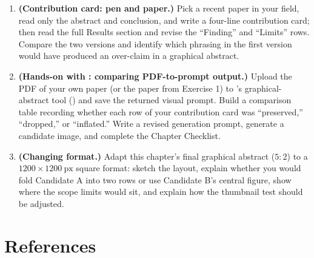 \begin{enumerate}
\item \textbf{(Contribution card: pen and paper.)} Pick a recent paper in your field, read only the abstract and conclusion, and write a four-line contribution card; then read the full Results section and revise the ``Finding'' and ``Limits'' rows. Compare the two versions and identify which phrasing in the first version would have produced an over-claim in a graphical abstract.
\item \textbf{(Hands-on with \scidraw{}: comparing PDF-to-prompt output.)} Upload the PDF of your own paper (or the paper from Exercise 1) to \scidraw{}'s graphical-abstract tool () and save the returned visual prompt. Build a comparison table recording whether each row of your contribution card was ``preserved,'' ``dropped,'' or ``inflated.'' Write a revised generation prompt, generate a candidate image, and complete the Chapter Checklist.
\item \textbf{(Changing format.)} Adapt this chapter's final graphical abstract ($5:2$) to a $1200 \times 1200\ \text{px}$ square format: sketch the layout, explain whether you would fold Candidate A into two rows or use Candidate B's central figure, show where the scope limits would sit, and explain how the thumbnail test should be adjusted.
\end{enumerate}

\section*{References}

